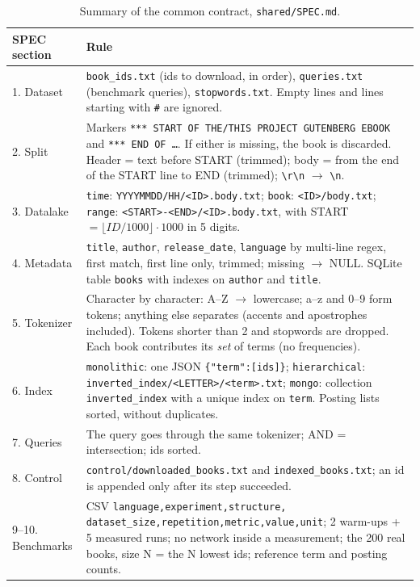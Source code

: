 \documentclass[11pt,a4paper]{article}
\newcommand{\code}[1]{\texttt{#1}}
\begin{document}
\begin{table}[H]
\centering\small
\begin{tabularx}{\linewidth}{@{}l Y@{}}
\toprule
SPEC section & Rule \\
. Dataset & \code{book\_ids.txt} (ids to download, in order), \code{queries.txt} (benchmark queries), \code{stopwords.txt}. Empty lines and lines starting with \code{\#} are ignored. \\
2. Split & Markers \code{*** START OF THE/THIS PROJECT GUTENBERG EBOOK} and \code{*** END OF \ldots}. If either is missing, the book is discarded. Header = text before START (trimmed); body = from the end of the START line to END (trimmed); \code{\textbackslash r\textbackslash n} $\rightarrow$ \code{\textbackslash n}. \\
3. Datalake & \code{time}: \code{YYYYMMDD/HH/<ID>.body.txt}; \code{book}: \code{<ID>/body.txt}; \code{range}: \code{<START>-<END>/<ID>.body.txt}, with START $= \lfloor ID/1000\rfloor\cdot 1000$ in 5 digits. \\
4. Metadata & \code{title}, \code{author}, \code{release\_date}, \code{language} by multi-line regex, first match, first line only, trimmed; missing $\rightarrow$ NULL. SQLite table \code{books} with indexes on \code{author} and \code{title}. \\
5. Tokenizer & Character by character: A--Z $\rightarrow$ lowercase; a--z and 0--9 form tokens; anything else separates (accents and apostrophes included). Tokens shorter than 2 and stopwords are dropped. Each book contributes its \emph{set} of terms (no frequencies). \\
6. Index & \code{monolithic}: one JSON \code{\{"term":[ids]\}}; \code{hierarchical}: \code{inverted\_index/<LETTER>/<term>.txt}; \code{mongo}: collection \code{inverted\_index} with a unique index on \code{term}. Posting lists sorted, without duplicates. \\
7. Queries & The query goes through the same tokenizer; AND = intersection; ids sorted. \\
8. Control & \code{control/downloaded\_books.txt} and \code{indexed\_books.txt}; an id is appended only after its step succeeded. \\
9--10. Benchmarks & CSV \code{language,experiment,structure,} \code{dataset\_size,repetition,metric,value,unit}; 2 warm-ups + 5 measured runs; no network inside a measurement; the 200 real books, size N = the N lowest ids; reference term and posting counts. \\
\bottomrule
\end{tabularx}
\caption{Summary of the common contract, \code{shared/SPEC.md}.}
\end{table}
\end{document}
